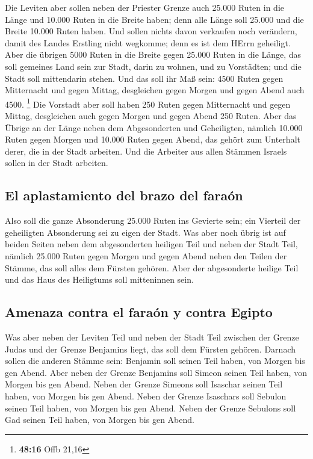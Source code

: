  Die Leviten aber sollen neben der Priester Grenze auch
25.000 Ruten in die Länge und 10.000 Ruten in die Breite haben; denn
alle Länge soll 25.000 und die Breite 10.000 Ruten haben.
 Und sollen nichts davon verkaufen noch verändern, damit
des Landes Erstling nicht wegkomme; denn es ist dem HErrn geheiligt.
 Aber die übrigen 5000 Ruten in die Breite gegen 25.000
Ruten in die Länge, das soll gemeines Land sein zur Stadt, darin zu
wohnen, und zu Vorstädten; und die Stadt soll mittendarin stehen.
 Und das soll ihr Maß sein: 4500 Ruten gegen Mitternacht
und gegen Mittag, desgleichen gegen Morgen und gegen Abend auch 4500.
\footnote{\textbf{48:16} Offb 21,16}  Die Vorstadt aber
soll haben 250 Ruten gegen Mitternacht und gegen Mittag, desgleichen
auch gegen Morgen und gegen Abend 250 Ruten.  Aber das
Übrige an der Länge neben dem Abgesonderten und Geheiligten, nämlich
10.000 Ruten gegen Morgen und 10.000 Ruten gegen Abend, das gehört zum
Unterhalt derer, die in der Stadt arbeiten.  Und die
Arbeiter aus allen Stämmen Israels sollen in der Stadt arbeiten.

\hypertarget{el-aplastamiento-del-brazo-del-farauxf3n}{%
\subsection{El aplastamiento del brazo del
faraón}\label{el-aplastamiento-del-brazo-del-farauxf3n}}

 Also soll die ganze Absonderung 25.000 Ruten ins
Gevierte sein; ein Vierteil der geheiligten Absonderung sei zu eigen der
Stadt.  Was aber noch übrig ist auf beiden Seiten neben
dem abgesonderten heiligen Teil und neben der Stadt Teil, nämlich 25.000
Ruten gegen Morgen und gegen Abend neben den Teilen der Stämme, das soll
alles dem Fürsten gehören. Aber der abgesonderte heilige Teil und das
Haus des Heiligtums soll mitteninnen sein.

\hypertarget{amenaza-contra-el-farauxf3n-y-contra-egipto}{%
\subsection{Amenaza contra el faraón y contra
Egipto}\label{amenaza-contra-el-farauxf3n-y-contra-egipto}}

 Was aber neben der Leviten Teil und neben der Stadt Teil
zwischen der Grenze Judas und der Grenze Benjamins liegt, das soll dem
Fürsten gehören.  Darnach sollen die anderen Stämme sein:
Benjamin soll seinen Teil haben, von Morgen bis gen Abend.
 Aber neben der Grenze Benjamins soll Simeon seinen Teil
haben, von Morgen bis gen Abend.  Neben der Grenze
Simeons soll Isaschar seinen Teil haben, von Morgen bis gen Abend.
 Neben der Grenze Isaschars soll Sebulon seinen Teil
haben, von Morgen bis gen Abend.  Neben der Grenze
Sebulons soll Gad seinen Teil haben, von Morgen bis gen Abend.

